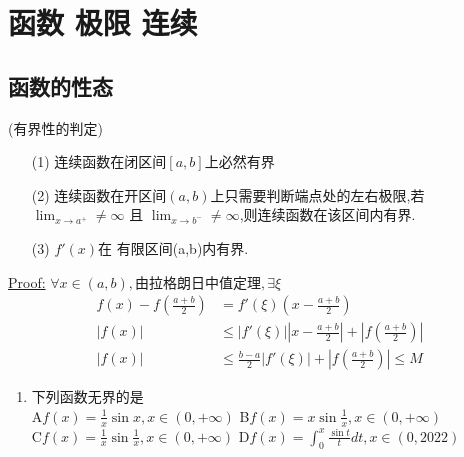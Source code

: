 \documentclass[12pt, a4paper, oneside, UTF8]{ctexbook}
\begin{document}

\else
\fi

\chapter{函数 极限 连续}
\section{函数的性态}
\begin{remark}(有界性的判定)
    \begin{enumerate}
    \item[(1)] 连续函数在闭区间$[a,b]$上必然有界 

    \item[(2)] 连续函数在开区间$(a,b)$上只需要判断端点处的左右极限,若$\lim_{x\to a^{+}}\neq \infty$ 且
    $\lim_{x\to b^{-}}\neq \infty$,则连续函数在该区间内有界.

    \item[(3)] $f'(x)$在{\color{red} 有限}区间(a,b)内有界.
    \end{enumerate}

    \underline{Proof:}
    $\forall x\in (a,b),\text{由拉格朗日中值定理},\exists\xi$ 
    \begin{align*}
        f(x)-f(\frac{a+b}{2}) &=f'(\xi)(x-\frac{a+b}{2}) \\
        \left|f(x)\right| &\leq \left|f'(\xi)\right|\left|x-\frac{a+b}{2}\right|+\left|f(\frac{a+b}{2})\right| \\
        \left|f(x)\right| &\leq \frac{b-a}{2}\left|f'(\xi)\right|+\left|f(\frac{a+b}{2})\right| \leq M
    \end{align*}
\end{remark}

\begin{enumerate}[label=\arabic*.]
    \item  下列函数无界的是 \\
    A\quad $f(x)=\frac{1}{x}\sin x, x\in(0,+\infty)$\qquad
    B\quad $f(x)=x\sin\frac{1}{x}, x\in(0,+\infty)$ \\
    C\quad $f(x)=\frac{1}{x}\sin\frac{1}{x}, x\in(0,+\infty)$ \qquad
    D\quad $f(x)=\int_0^x\frac{\sin t}{t} dt, x\in(0,2022)$
    
\end{enumerate}
\end{document}
